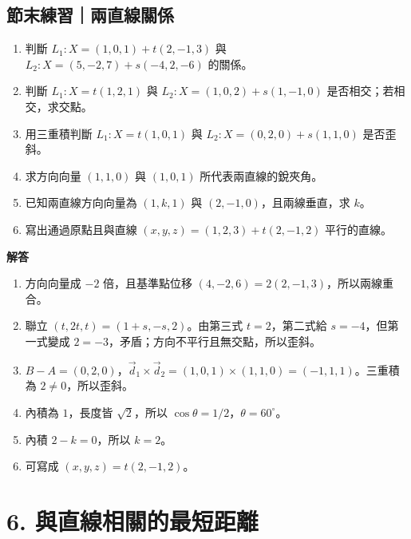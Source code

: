 \documentclass[11pt,a4paper]{article}
\providecommand{\tightlist}{%
  \setlength{\itemsep}{0pt}\setlength{\parskip}{0pt}}
\begin{document}
\begin{HandoutSelfCheck}

\subsection{節末練習｜兩直線關係}\label{ux7bc0ux672bux7df4ux7fd2ux5169ux76f4ux7ddaux95dcux4fc2}

\begin{enumerate}
\def\labelenumi{\arabic{enumi}.}
\tightlist
\item
  判斷 \(L_1:X=(1,0,1)+t(2,-1,3)\) 與 \(L_2:X=(5,-2,7)+s(-4,2,-6)\) 的關係。
\item
  判斷 \(L_1:X=t(1,2,1)\) 與 \(L_2:X=(1,0,2)+s(1,-1,0)\) 是否相交；若相交，求交點。
\item
  用三重積判斷 \(L_1:X=t(1,0,1)\) 與 \(L_2:X=(0,2,0)+s(1,1,0)\) 是否歪斜。
\item
  求方向向量 \((1,1,0)\) 與 \((1,0,1)\) 所代表兩直線的銳夾角。
\item
  已知兩直線方向向量為 \((1,k,1)\) 與 \((2,-1,0)\)，且兩線垂直，求 \(k\)。
\item
  寫出通過原點且與直線 \((x,y,z)=(1,2,3)+t(2,-1,2)\) 平行的直線。
\end{enumerate}

\textbf{解答}

\begin{enumerate}
\def\labelenumi{\arabic{enumi}.}
\tightlist
\item
  方向向量成 \(-2\) 倍，且基準點位移 \((4,-2,6)=2(2,-1,3)\)，所以兩線重合。
\item
  聯立 \((t,2t,t)=(1+s,-s,2)\)。由第三式 \(t=2\)，第二式給 \(s=-4\)，但第一式變成 \(2=-3\)，矛盾；方向不平行且無交點，所以歪斜。
\item
  \(B-A=(0,2,0)\)，\(\vec d_1\times\vec d_2=(1,0,1)\times(1,1,0)=(-1,1,1)\)。三重積為 \(2\ne0\)，所以歪斜。
\item
  內積為 \(1\)，長度皆 \(\sqrt2\)，所以 \(\cos\theta=1/2\)，\(\boxed{\theta=60^\circ}\)。
\item
  內積 \(2-k=0\)，所以 \(\boxed{k=2}\)。
\item
  可寫成 \(\boxed{(x,y,z)=t(2,-1,2)}\)。
\end{enumerate}

\end{HandoutSelfCheck}

\section{6. 與直線相關的最短距離}\label{ux8207ux76f4ux7ddaux76f8ux95dcux7684ux6700ux77edux8dddux96e2}
\end{document}
